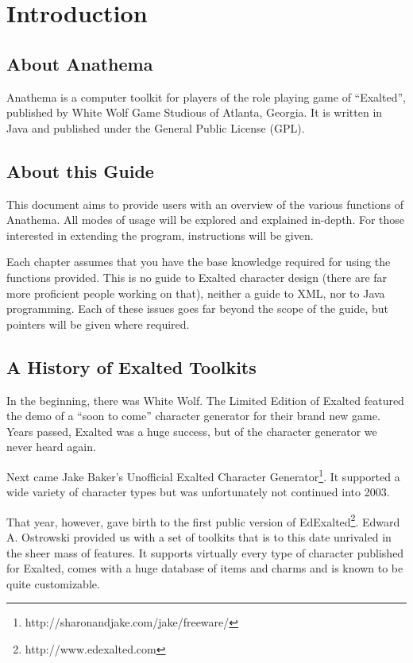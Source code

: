 \chapter{Introduction}
\section{About Anathema}
Anathema is a computer toolkit for players of the role playing game of ``Exalted'', published by White Wolf Game Studious of Atlanta, Georgia. It is written in Java and published under the General Public License (GPL).

\section{About this Guide}
This document aims to provide users with an overview of the various functions of Anathema. All modes of usage will be explored and explained in-depth. For those interested in extending the program, instructions will be given.

Each chapter assumes that you have the base knowledge required for using the functions provided. This is no guide to Exalted character design (there are far more proficient people working on that), neither a guide to XML, nor to Java programming. Each of these issues goes far beyond the scope of the guide, but pointers will be given where required.

\section{A History of Exalted Toolkits}
In the beginning, there was White Wolf. The Limited Edition of Exalted featured the demo of a ``soon to come'' character generator for their brand new game. Years passed, Exalted was a huge success, but of the character generator we never heard again.

Next came Jake Baker's Unofficial Exalted Character Generator\footnote{http://sharonandjake.com/jake/freeware/}. It supported a wide variety of character types but was unfortunately not continued into 2003.

That year, however, gave birth to the first public version of EdExalted\footnote{http://www.edexalted.com}. Edward A. Ostrowski provided us with a set of toolkits that is to this date unrivaled in the sheer mass of features. It supports virtually every type of character published for Exalted, comes with a huge database of items and charms and is known to be quite customizable.

